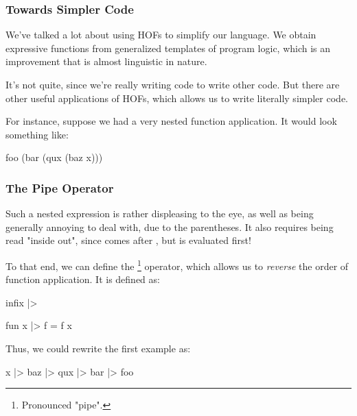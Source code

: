 \documentclass[aspectratio=169, handout]{beamer}
\begin{document}

\begin{frame}[fragile]
  \frametitle{Towards Simpler Code}

  We've talked a lot about using HOFs to simplify our language. We obtain expressive
  functions from generalized templates of program logic, which is an improvement that
  is almost linguistic in nature.

  \pause
  \vspace{\fill}

  It's not quite, since we're really writing code to write other code. But there are
  other useful applications of HOFs, which allows us to write literally simpler code.

  \pause
  \vspace{\fill}

  For instance, suppose we had a very nested function application. It would look
  something like:

  \begin{codeblock}
    foo (bar (qux (baz x)))
  \end{codeblock}
\end{frame}

\begin{frame}[fragile]
  \frametitle{The Pipe Operator}

  Such a nested expression is rather displeasing to the eye, as well as being
  generally annoying to deal with, due to the parentheses. It also requires being
  read "inside out", since  comes after , but is evaluated first!

  \pause
  \vspace{\fill}

  To that end, we can define the \code{|>}\footnote{Pronounced "pipe".} operator, which allows us to
  \textit{reverse} the order of function application. It is defined as:

  \pause
  \begin{codeblock}
    infix |>

    fun x |> f = f x
  \end{codeblock}

  \pause
  \vspace{\fill}

  Thus, we could rewrite the first example as:

  \begin{codeblock}
    x |> baz |> qux |> bar |> foo
  \end{codeblock}
\end{frame}
\end{document}
